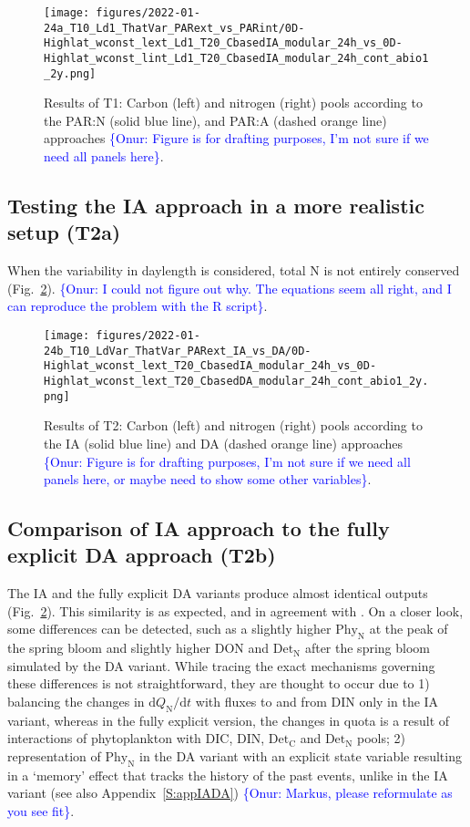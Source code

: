 \documentclass[gmd, manuscript, draft]{copernicus}
\newcommand{\onur}[1]{\textcolor{blue}{\{Onur: #1\}}}
\begin{document}
\begin{figure}[ht!]
\texttt{[image: figures/2022-01-24a\_T10\_Ld1\_ThatVar\_PARext\_vs\_PARint/0D-Highlat\_wconst\_lext\_Ld1\_T20\_CbasedIA\_modular\_24h\_vs\_0D-Highlat\_wconst\_lint\_Ld1\_T20\_CbasedIA\_modular\_24h\_cont\_abio1\_2y.png]}
\caption{Results of T1: Carbon (left) and nitrogen (right) pools according to the PAR:N (solid blue line), and PAR:A (dashed orange line) approaches \onur{Figure is for drafting purposes, I'm not sure if we need all panels here}.\label{f.T1res}}
\end{figure}

\FloatBarrier

\subsection{Testing the IA approach in a more realistic setup (T2a)}
When the variability in daylength is considered, total N is not entirely conserved (Fig.~\ref{f.T2res}). \onur{I could not figure out why. The equations seem all right, and I can reproduce the problem with the R script}.

\begin{figure}[ht!]
\texttt{[image: figures/2022-01-24b\_T10\_LdVar\_ThatVar\_PARext\_IA\_vs\_DA/0D-Highlat\_wconst\_lext\_T20\_CbasedIA\_modular\_24h\_vs\_0D-Highlat\_wconst\_lext\_T20\_CbasedDA\_modular\_24h\_cont\_abio1\_2y.png]}
\caption{Results of T2: Carbon (left) and nitrogen (right) pools according to the IA (solid blue line) and DA (dashed orange line) approaches  \onur{Figure is for drafting purposes, I'm not sure if we need all panels here, or maybe need to show some other variables}.\label{f.T2res}}
\end{figure}

\subsection{Comparison of IA approach to the fully explicit DA approach (T2b)}
The IA and the fully explicit DA variants produce almost identical outputs (Fig.~\ref{f.T2res}). This similarity is as expected, and in agreement with \citet{Ward2017}. On a closer look, some differences can be detected, such as a slightly higher $\text{Phy}_{\text{N}}$ at the peak of the spring bloom and slightly higher DON and $\text{Det}_{\text{N}}$ after the spring bloom simulated by the DA variant. While tracing the exact mechanisms governing these differences is not straightforward, they are thought to occur due to 1) balancing the changes in $\text{d}Q_{\text{N}}/\text{d}t$ with fluxes to and from DIN only in the IA variant, whereas in the fully explicit version, the changes in quota is a result of interactions of phytoplankton with DIC, DIN, $\text{Det}_{\text{C}}$ and $\text{Det}_{\text{N}}$ pools; 2) representation of $\text{Phy}_{\text{N}}$ in the DA variant with an explicit state variable resulting in a `memory' effect that tracks the history of the past events, unlike in the IA variant (see also Appendix~\ref{S:appIADA}) \onur{Markus, please reformulate as you see fit}.
\end{document}
